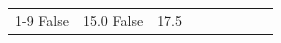 \begin{table}[H]
\begin{tabular}{lllrlllll}
\cline{1-9}
False & 15.0%
\cline{1-9}
False & 17.5%

\end{tabular}
\end{table}
